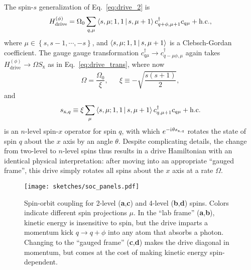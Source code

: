 \documentclass[nofootinbib,twocolumn]{revtex4-2}
\renewcommand{\t}{\text} %
\newcommand{\f}[2]{\dfrac{#1}{#2}} %
\renewcommand{\set}[1]{\left\{#1\right\}} %
\newcommand{\bk}{\Braket} %
\renewcommand{\i}{\mathrm{i}\mkern1mu} %
\newcommand{\1}{\mathds{1}}
\newcommand{\x}{\text{x}}
\begin{document}
The spin-$s$ generalization of Eq.~\eqref{eq:drive_2} is
\begin{align}
  H_{\t{drive}}^{(\phi)} = \Omega_0 \sum_{q,\mu} \bk{s,\mu;1,1|s,\mu+1}
  c_{q+\phi,\mu+1}^\dag c_{q\mu} + \t{h.c.},
\end{align}
where $\mu\in\set{s,s-1,\cdots,-s}$, and $\bk{s,\mu;1,1|s,\mu+1}$ is a Clebsch-Gordan coefficient.
The gauge gauge transformation $c_{q\mu}^\dag\to c_{q-\mu\phi,\mu}^\dag$ again takes $H_{\t{drive}}^{(\phi)}\to \Omega S_\x$ as in Eq.~\eqref{eq:drive_trans}, where now
\begin{align}
  \Omega = \f{\Omega_0}{\xi},
  &&
  \xi \equiv -\sqrt{\f{s(s+1)}{2}},
\end{align}
and
\begin{align}
  s_{\x,q} \equiv \xi \sum_\mu \bk{s,\mu;1,1|s,\mu+1} c_{q,\mu+1}^\dag c_{q\mu} + \t{h.c.}
  \label{eq:spin_x_op}
\end{align}
is an $n$-level spin-$x$ operator for spin $q$, with which $e^{-\i\theta s_{\x,q}}$ rotates the state of spin $q$ about the $x$ axis by an angle $\theta$.
Despite complicating details, the change from two-level to $n$-level spins thus results in a drive Hamiltonian with an identical physical interpretation: after moving into an appropriate ``gauged frame'', this drive simply rotates all spins about the $x$ axis at a rate $\Omega$.

\begin{figure}
\centering
\texttt{[image: sketches/soc\_panels.pdf]}
\caption{
Spin-orbit coupling for 2-level ({\bf a},{\bf c}) and 4-level ({\bf b},{\bf d}) spins.
Colors indicate different spin projections $\mu$.
In the ``lab frame'' ({\bf a},{\bf b}), kinetic energy is insensitive to spin, but the drive imparts a momentum kick $q\to q+\phi$ into any atom that absorbs a photon.
Changing to the ``gauged frame'' ({\bf c},{\bf d}) makes the drive diagonal in momentum, but comes at the cost of making kinetic energy spin-dependent.
}
\label{fig:soc_panels}
\end{figure}
\end{document}
